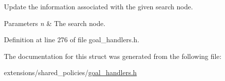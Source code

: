 Update the information associated with the given search node. 


\begin{DoxyParams}{Parameters}
{\em n} & The search node. \\
\hline
\end{DoxyParams}


Definition at line 276 of file goal\+\_\+handlers.\+h.



The documentation for this struct was generated from the following file\+:\begin{DoxyCompactItemize}
\item 
extensions/shared\+\_\+policies/\hyperlink{goal__handlers_8h}{goal\+\_\+handlers.\+h}\end{DoxyCompactItemize}
